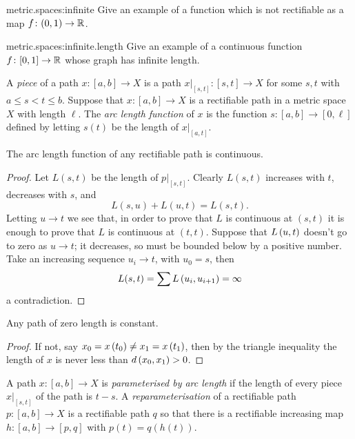 \begin{problem}{metric.spaces:infinite}
Give an example of a function which is not rectifiable as a map \(f \colon (0,1) \to \mathbb{R}^{}\). 
\end{problem}
\begin{problem}{metric.spaces:infinite.length}
Give an example of a continuous function \(f \colon [0,1] \to \mathbb{R}^{}\) whose graph has infinite length.
\end{problem}
A \emph{piece} of a path \(x \colon [a,b] \to X\) is a path \(\left.x\right|_{[s,t]} \colon [s,t] \to X\) for some \(s,t\) with \(a \le s < t \le b\).
Suppose that \(x \colon [a,b] \to X\) is a rectifiable path in a metric space \(X\) with length \(\ell\).
The \emph{arc length function} of \(x\) is the function \(s \colon [a,b] \to [0,\ell]\) defined by letting \(s(t)\) be the length of \(\left.x\right|_{[a,t]}\).
\begin{lemma}
The arc length function of any rectifiable path is continuous.
\end{lemma}
\begin{proof}
Let \(L(s,t)\) be the length of \(\left.p\right|_{[s,t]}\).
Clearly \(L(s,t)\) increases with \(t\), decreases with \(s\), and
\[
L(s,u)+L(u,t)=L(s,t).
\]
Letting \(u \to t\) we see that, in order to prove that \(L\) is continuous at \((s,t)\) it is enough to prove that \(L\) is continuous at \((t,t)\).
Suppose that \(L\left(u,t\right)\) doesn't go to zero as \(u \to t\); it decreases, so must be bounded below by a positive number.
Take an increasing sequence \(u_i \to t\), with \(u_0=s\), then
\[
L(s,t)=\sum L\left(u_i,u_{i+1}\right)=\infty
\]
a contradiction.
\end{proof}
\begin{lemma}
Any path of zero length is constant.
\end{lemma}
\begin{proof}
If not, say \(x_0=x\left(t_0\right) \ne x_1=x\left(t_1\right)\), then by the triangle inequality the length of \(x\) is never less than \(d\left(x_0,x_1\right)>0\).
\end{proof}
A path \(x \colon [a,b] \to X\) is \emph{parameterised by arc length} if the length of every piece \(\left.x\right|_{[s,t]}\) of the path is \(t-s\).
A \emph{reparameterisation} of a rectifiable path \(p \colon [a,b] \to X\) is a rectifiable path \(q\) so that there is a rectifiable increasing map \(h \colon [a,b] \to [p,q]\) with \(p(t)=q(h(t))\).
